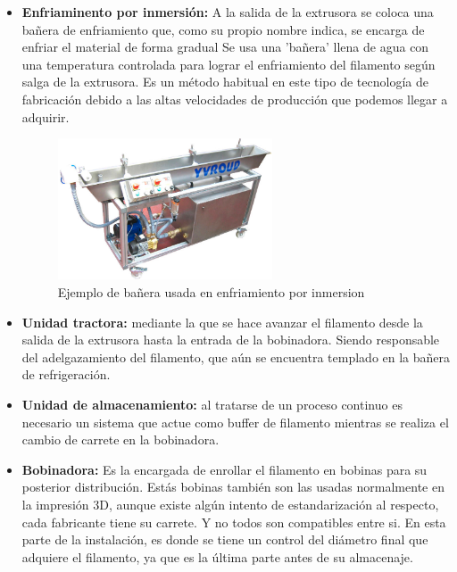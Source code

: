 \begin{itemize}
\begin{figure}[H]
    	\label{fig:intro_extrusora}
	\end{figure}
    En la instalación sobre la que vamos a implementar el desarrollo contenido en este proyecto, la forma final es cilíndrica. Aunque existen multitud de modelos de boquilla para extruir el material con disintas formas. (Ver figura \ref{fig:intro_extrusora})
    \item \textbf{Enfriaminento por inmersión:} 
    A la salida de la extrusora se coloca una bañera de enfriamiento que, como su propio nombre indica, se encarga de enfriar el material de forma gradual
    Se usa una 'bañera' llena de agua con una temperatura controlada para lograr el enfriamiento del filamento según salga de la extrusora.
    Es un método habitual en este tipo de tecnología de fabricación debido a las altas velocidades de producción que podemos llegar a adquirir.
    \begin{figure}[H]
    	\centering
    	\includegraphics[width=0.6\textwidth]{images/enfriamiento.png}
    	\caption{Ejemplo de bañera usada en enfriamiento por inmersion}
    	\label{fig:intro_bañera}
	\end{figure}
    \item \textbf{Unidad tractora:} mediante la que se hace avanzar el filamento desde la salida de la extrusora hasta la entrada de la bobinadora. Siendo responsable del adelgazamiento del filamento, que aún se encuentra templado en la bañera de refrigeración.
    \item \textbf{Unidad de almacenamiento:} al tratarse de un proceso continuo es necesario un sistema que actue como buffer de filamento mientras se realiza el cambio de carrete en la bobinadora.
    \item \textbf{Bobinadora:} Es la encargada de enrollar el filamento en bobinas para su posterior distribución. Estás bobinas también son las usadas normalmente en la impresión 3D, aunque existe algún intento de estandarización al respecto, cada fabricante tiene su carrete. Y no todos son compatibles entre si. En esta parte de la instalación, es donde se tiene un control del diámetro final que adquiere el filamento, ya que es la última parte antes de su almacenaje.

\end{itemize}
